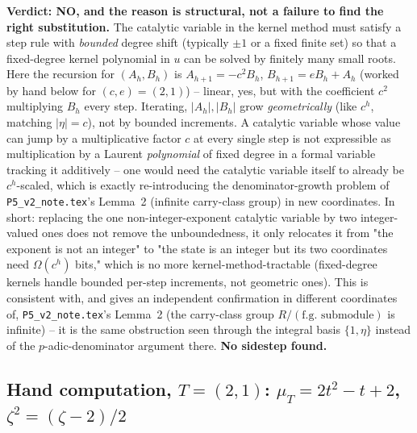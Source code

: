 \documentclass[11pt]{article}
\begin{document}
\textbf{Verdict: NO, and the reason is structural, not a failure to find the right substitution.}
The catalytic variable in the kernel method must satisfy a step rule with \emph{bounded} degree
shift (typically $\pm1$ or a fixed finite set) so that a fixed-degree kernel polynomial in $u$ can be
solved by finitely many small roots. Here the recursion for $(A_h,B_h)$ is $A_{h+1}=-c^2B_h$,
$B_{h+1}=eB_h+A_h$ (worked by hand below for $(c,e)=(2,1)$) -- linear, yes, but with the coefficient
$c^2$ multiplying $B_h$ every step. Iterating, $|A_h|,|B_h|$ grow \emph{geometrically} (like $c^h$,
matching $|\eta|=c$), not by bounded increments. A catalytic variable whose value can jump by a
multiplicative factor $c$ at every single step is not expressible as multiplication by a Laurent
\emph{polynomial} of fixed degree in a formal variable tracking it additively -- one would need the
catalytic variable itself to already be $c^h$-scaled, which is exactly re-introducing the
denominator-growth problem of \texttt{P5\_v2\_note.tex}'s Lemma~2 (infinite carry-class group) in new
coordinates. In short: replacing the one non-integer-exponent catalytic variable by two
integer-valued ones does not remove the unboundedness, it only relocates it from "the exponent is
not an integer" to "the state is an integer but its two coordinates need $\Omega(c^h)$ bits," which
is no more kernel-method-tractable (fixed-degree kernels handle bounded per-step increments, not
geometric ones). This is consistent with, and gives an independent confirmation in different
coordinates of, \texttt{P5\_v2\_note.tex}'s Lemma~2 (the carry-class group $R/(\text{f.g. submodule})$
is infinite) -- it is the same obstruction seen through the integral basis $\{1,\eta\}$ instead of
the $p$-adic-denominator argument there. \textbf{No sidestep found.}

\subsection*{Hand computation, $T=(2,1)$: $\mu_T=2t^2-t+2$, $\zeta^2=(\zeta-2)/2$}
\end{document}

